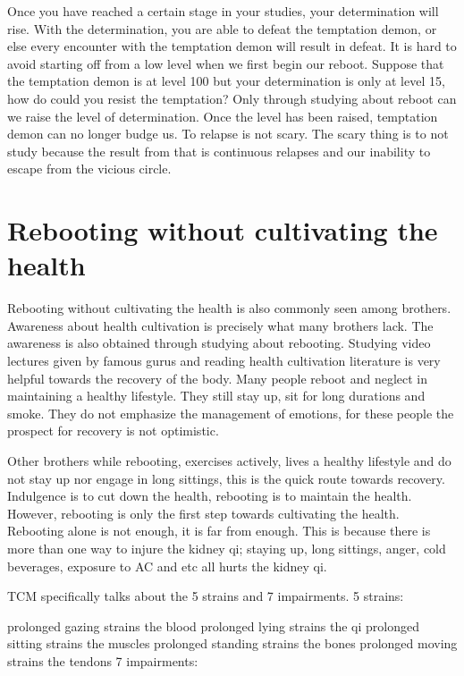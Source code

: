 \documentclass[
]{book}
\begin{document}
Once you have reached a certain stage in your studies, your determination will rise. With the determination, you are able to defeat the temptation demon, or else every encounter with the temptation demon will result in defeat. It is hard to avoid starting off from a low level when we first begin our reboot. Suppose that the temptation demon is at level 100 but your determination is only at level 15, how do could you resist the temptation? Only through studying about reboot can we raise the level of determination. Once the level has been raised, temptation demon can no longer budge us. To relapse is not scary. The scary thing is to not study because the result from that is continuous relapses and our inability to escape from the vicious circle.

\hypertarget{rebooting-without-cultivating-the-health}{%
\section{Rebooting without cultivating the health}\label{rebooting-without-cultivating-the-health}}

Rebooting without cultivating the health is also commonly seen among brothers. Awareness about health cultivation is precisely what many brothers lack. The awareness is also obtained through studying about rebooting. Studying video lectures given by famous gurus and reading health cultivation literature is very helpful towards the recovery of the body. Many people reboot and neglect in maintaining a healthy lifestyle. They still stay up, sit for long durations and smoke. They do not emphasize the management of emotions, for these people the prospect for recovery is not optimistic.

Other brothers while rebooting, exercises actively, lives a healthy lifestyle and do not stay up nor engage in long sittings, this is the quick route towards recovery. Indulgence is to cut down the health, rebooting is to maintain the health. However, rebooting is only the first step towards cultivating the health. Rebooting alone is not enough, it is far from enough. This is because there is more than one way to injure the kidney qi; staying up, long sittings, anger, cold beverages, exposure to AC and etc all hurts the kidney qi.

TCM specifically talks about the 5 strains and 7 impairments.
5 strains:

prolonged gazing strains the blood
prolonged lying strains the qi
prolonged sitting strains the muscles
prolonged standing strains the bones
prolonged moving strains the tendons
7 impairments:
\end{document}
